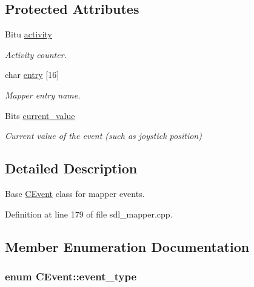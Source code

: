 \subsection*{Protected Attributes}
\begin{DoxyCompactItemize}
\item 
\hypertarget{classCEvent_a487786e4e537594bf963e96aecae85cd}{Bitu \hyperlink{classCEvent_a487786e4e537594bf963e96aecae85cd}{activity}}\label{classCEvent_a487786e4e537594bf963e96aecae85cd}

\begin{DoxyCompactList}\small\item\em Activity counter. \end{DoxyCompactList}\item 
\hypertarget{classCEvent_a20cca21cb3c606f3161a2757c1ba466d}{char \hyperlink{classCEvent_a20cca21cb3c606f3161a2757c1ba466d}{entry} \mbox{[}16\mbox{]}}\label{classCEvent_a20cca21cb3c606f3161a2757c1ba466d}

\begin{DoxyCompactList}\small\item\em Mapper entry name. \end{DoxyCompactList}\item 
\hypertarget{classCEvent_a7bbacdb8e3c5ee41ce13af19dc21db2d}{Bits \hyperlink{classCEvent_a7bbacdb8e3c5ee41ce13af19dc21db2d}{current\-\_\-value}}\label{classCEvent_a7bbacdb8e3c5ee41ce13af19dc21db2d}

\begin{DoxyCompactList}\small\item\em Current value of the event (such as joystick position) \end{DoxyCompactList}\end{DoxyCompactItemize}


\subsection{Detailed Description}
Base \hyperlink{classCEvent}{C\-Event} class for mapper events. 

Definition at line 179 of file sdl\-\_\-mapper.\-cpp.



\subsection{Member Enumeration Documentation}
\hypertarget{classCEvent_a93a65775636793dfcabe38d14739c2bd}{
\subsubsection[{event\-\_\-type}]{\setlength{\rightskip}{0pt plus 5cm}enum {\bf C\-Event\-::event\-\_\-type}}}\label{classCEvent_a93a65775636793dfcabe38d14739c2bd}



